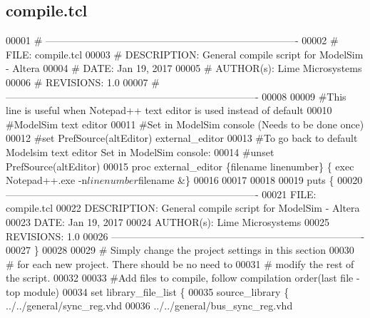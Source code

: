 \subsection{compile.\+tcl}
\label{rx__path__top_2rx__path_2compile_8tcl_source}

\begin{DoxyCode}
00001 \textcolor{comment}{# ---------------------------------------------------------------------------- }
00002 \textcolor{comment}{}\textcolor{comment}{# FILE:    compile.tcl}
00003 \textcolor{comment}{}\textcolor{comment}{# DESCRIPTION: General compile script for ModelSim - Altera}
00004 \textcolor{comment}{}\textcolor{comment}{# DATE:    Jan 19, 2017}
00005 \textcolor{comment}{}\textcolor{comment}{# AUTHOR(s):   Lime Microsystems}
00006 \textcolor{comment}{}\textcolor{comment}{# REVISIONS: 1.0}
00007 \textcolor{comment}{}\textcolor{comment}{# ----------------------------------------------------------------------------}
00008 \textcolor{comment}{}
00009 \textcolor{comment}{#This line is useful when Notepad++ text editor is used instead of default }
00010 \textcolor{comment}{}\textcolor{comment}{#ModelSim text editor}
00011 \textcolor{comment}{}\textcolor{comment}{#Set in ModelSim console (Needs to be done once)}
00012 \textcolor{comment}{}\textcolor{comment}{#set PrefSource(altEditor) external\_editor}
00013 \textcolor{comment}{}\textcolor{comment}{#To go back to default Modelsim text editor Set in ModelSim console:}
00014 \textcolor{comment}{}\textcolor{comment}{#unset PrefSource(altEditor)}
00015 \textcolor{comment}{}\textcolor{keyword}{proc} external\_editor \{filename linenumber\} \{ \textcolor{keyword}{exec} Notepad++.exe -n$linenumber $filename &\}\textcolor{comment}{}
00016 \textcolor{comment}{}
00017 
00018 
00019 \textcolor{keyword}{puts} \{
00020  ----------------------------------------------------------------------------  
00021  FILE:     compile.tcl
00022  DESCRIPTION:  General compile script for ModelSim - Altera
00023  DATE: Jan 19, 2017
00024  AUTHOR(s):    Lime Microsystems
00025  REVISIONS: 1.0
00026  ----------------------------------------------------------------------------
00027 \}\textcolor{comment}{}
00028 \textcolor{comment}{}
00029 \textcolor{comment}{# Simply change the project settings in this section}
00030 \textcolor{comment}{}\textcolor{comment}{# for each new project. There should be no need to}
00031 \textcolor{comment}{}\textcolor{comment}{# modify the rest of the script.}
00032 \textcolor{comment}{}
00033 \textcolor{comment}{#Add files to compile, follow compilation order(last file - top module)}
00034 \textcolor{comment}{}\textcolor{keyword}{set} library\_file\_list \{
00035                            source\_library \{ ../../general/sync\_reg.vhd
00036                                             ../../general/bus\_sync\_reg.vhd                            
          

\end{DoxyCode}

